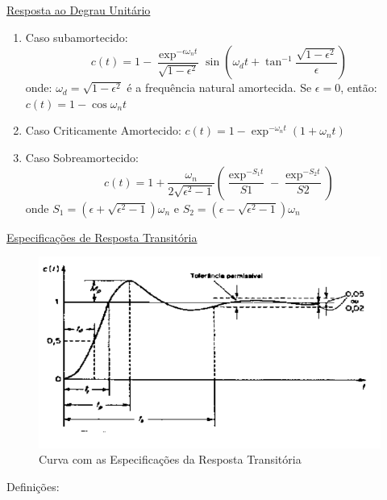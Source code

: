 \hspace{4ex} \underline{Resposta ao Degrau Unitário}

\begin{enumerate}
    \item Caso subamortecido: 
        \[c(t)=1-\frac{\exp^{-\epsilon\omega_n t}}{\sqrt{1-\epsilon^2}}\sin(\omega_d t+\tan^{-1}\frac{\sqrt{1-\epsilon^2}}{\epsilon})\]
onde: \(\omega_d=\sqrt{1-\epsilon^2}\) é a frequência natural amortecida.
\newline
Se \(\epsilon=0\), então: \(c(t)=1-\cos\omega_n t\)

    \item Caso Criticamente Amortecido: \(c(t)=1-\exp^{-\omega_n t}(1+\omega_n t)\)

    \item Caso Sobreamortecido: 
    \[c(t)=1+\frac{\omega_n}{2\sqrt{\epsilon^2 -1}}(\frac{\exp^{-S_1 t}}{S1}-\frac{\exp^{-S_2 t}}{S2})\]
onde \(S_1=(\epsilon+\sqrt{\epsilon^2 -1})\omega_n\) e \(S_2=(\epsilon-\sqrt{\epsilon^2 -1})\omega_n\)
\newline
\end{enumerate}

\hspace{4ex} \underline{Especificações de Resposta Transitória}

\begin{figure}[h]
    \centering
    \includegraphics[width=15cm]{images/roteiro b/img ref teorico/curva.PNG}
    \caption{Curva com as Especificações da Resposta Transitória}
    \label{fig:curva}
\end{figure}

\hspace{4ex}Definições:

